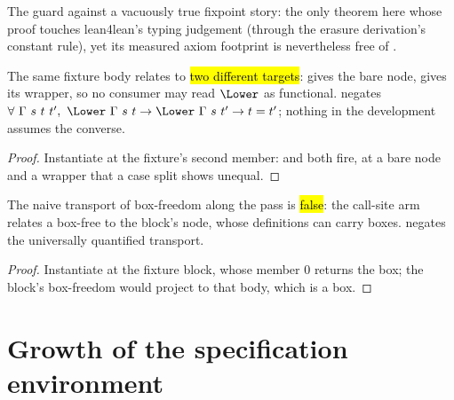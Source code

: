 \begin{remark}
 The guard against a vacuously true fixpoint story: the only theorem here whose proof
touches lean4lean's typing judgement (through the erasure derivation's constant rule), yet its measured
axiom footprint is nevertheless free of .
\end{remark}

\begin{lemma}
\label{lem:LowerFixFixture-lower_not_functional}
\leanok
{}
 The same fixture body relates to \hl{two different targets}:  gives the
bare  node,  gives its wrapper, so no consumer may read $\Lower$ as functional.
 negates $\forall\ \Gamma\ s\ t\ t',\ \Lower\ \Gamma\ s\ t \to \Lower\ \Gamma\ s\ t' \to t =
t'$; nothing in the development assumes the converse.
\end{lemma}
\begin{proof}
\leanok
{}
 Instantiate at the fixture's second member:  and
 both fire, at a bare node and a wrapper that a case split shows unequal.
\end{proof}

\begin{lemma}
\label{lem:noBox_lower_needs_noFix}
\leanok
{}
 The naive transport of box-freedom along the pass is \hl{false}: the call-site arm
relates a box-free  to the block's  node, whose definitions can carry boxes.
 negates the universally quantified transport.
\end{lemma}
\begin{proof}
\leanok
{}
 Instantiate at the fixture block, whose member $0$ returns the box; the block's box-freedom
would project to that body, which is a box.
\end{proof}

\section{Growth of the specification environment}
\label{sec:lowering:growth}

